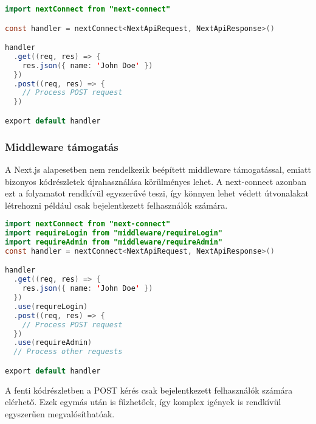\begin{lstlisting}[language=Java, caption=Kérés kezelése next-connect segítségével]
import nextConnect from "next-connect"

const handler = nextConnect<NextApiRequest, NextApiResponse>()

handler
  .get((req, res) => {
    res.json({ name: 'John Doe' })
  })
  .post((req, res) => {
    // Process POST request
  })

export default handler
\end{lstlisting}

\subsubsection{Middleware támogatás}
A Next.js alapesetben nem rendelkezik beépített middleware támogatással, emiatt bizonyos kódrészletek újrahasználása körülményes lehet.
A next-connect azonban ezt a folyamatot rendkívül egyszerűvé teszi, így könnyen lehet védett útvonalakat létrehozni például csak bejelentkezett
felhasználók számára.

\begin{lstlisting}[language=Java, caption=Middleware kezelés next-connect segítségével]
import nextConnect from "next-connect"
import requireLogin from "middleware/requireLogin"
import requireAdmin from "middleware/requireAdmin"
const handler = nextConnect<NextApiRequest, NextApiResponse>()

handler
  .get((req, res) => {
    res.json({ name: 'John Doe' })
  })
  .use(requreLogin)
  .post((req, res) => {
    // Process POST request
  })
  .use(requireAdmin)
  // Process other requests

export default handler
\end{lstlisting}

A fenti kódrészletben a POST kérés csak bejelentkezett felhasználók számára elérhető. Ezek egymás után is fűzhetőek, így komplex
igények is rendkívül egyszerűen megvalósíthatóak.
